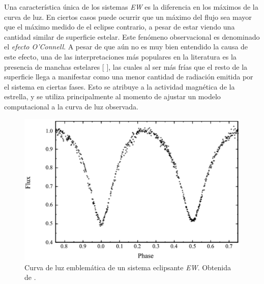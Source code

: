 Una característica única de los sistemas \textit{EW} es la diferencia en los
máximos de la curva de luz. En ciertos casos puede ocurrir que un máximo del
flujo sea mayor que el máximo medido de el eclipse contrario, a pesar de estar
viendo una cantidad similar de superficie estelar. Este fenómeno observacional
es denominado el \textit{efecto O'Connell}. A pesar de que aún no es muy bien
entendido la causa de este efecto, una de las interpretaciones más populares en
la literatura es la presencia de manchas estelares
[\autocite{ding_fast_derivation_cbs_params_2022}
\autocite{michel_photometric_study_contact_binary_2023}
\autocite{michel_rotse1_new_wuma_eclipsing_binary_2016}], las cuales al ser más
frías que el resto de la superficie llega a manifestar como una menor cantidad
de radiación emitida por el sistema en ciertas fases. Esto se atribuye a la
actividad magnética de la estrella, y se utiliza principalmente al momento de
ajustar un modelo computacional a la curva de luz observada.

\begin{figure}[!ht]
	\centering
	\includegraphics[scale=0.63]{Introduccion/Figures/Figura EW Curva_Modelling of WUMa Stars.png}
	\caption{Curva de luz emblemática de un sistema eclipsante
	\textit{EW}. Obtenida de
	\autocite{skelton_modelling_wuma_variable_stars_2009}.}
	\label{figuraEWCurvaLuz}
\end{figure}